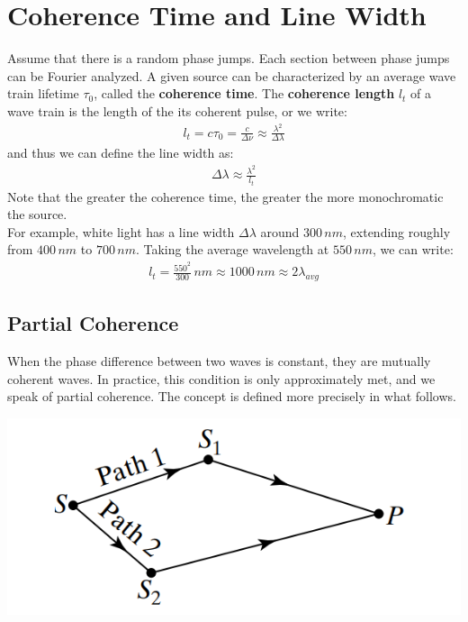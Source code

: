 \documentclass[11pt]{book}
\theoremstyle{break}
\theoremstyle{break}
\begin{document}
\newpage
\section[Coherence Time and Line Width]{\color{red}Coherence Time and Line Width\color{black}}
Assume that there is a random phase jumps. Each section between phase jumps can be Fourier analyzed. A given source can be characterized by an average wave train lifetime $\tau_0$, called the \textbf{coherence time}. The \textbf{coherence length} $l_t$ of a wave train is the length of the its coherent pulse, or we write:
\begin{align*}
l_t = c\tau_0 = \frac{c}{\Delta \nu} \approx \frac{\lambda^2}{\Delta \lambda}
\end{align*}
and thus we can define the line width as:
\begin{align*}
\Delta \lambda \approx \frac{\lambda^2}{l_t}
\end{align*}
Note that the greater the coherence time, the greater the more monochromatic the source. \\


For example, white light has a line width $\Delta \lambda$ around $300\, nm$, extending roughly from $400\, nm$ to $700\, nm$. Taking the average wavelength at $550\, nm$, we can write:
\begin{align*}
l_t = \frac{550^2}{300}\, nm \approx 1000\, nm \approx 2\lambda_{avg}
\end{align*}

\subsection{Partial Coherence}
When the phase difference between two waves is constant, they are mutually coherent waves. In practice, this condition is only approximately met, and we speak of partial coherence. The concept is defined more precisely in what follows. 
\begin{center}
\includegraphics[scale=0.45]{diffPaths}
\end{center}
\end{document}

